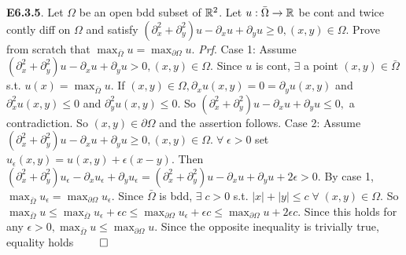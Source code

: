{\bf E6.3.5}. Let $\Omega$ be an open bdd subset of $\mathbb{R}^2$. Let $u: \bar{\Omega}\rightarrow \mathbb{R}$ be cont and twice contly diff on $\Omega$ and satisfy $(\partial_x^2 + \partial_y^2)u - \partial_x u + \partial_y u \geq 0,  (x,y) \in \Omega.$ Prove from scratch that $\max_{\bar{\Omega}} u = \max_{\partial \Omega} u$. {\it Prf}. Case 1:  Assume $(\partial_x^2 + \partial_y^2)u - \partial_x u + \partial_y u > 0, (x,y) \in \Omega$. Since $u$ is cont, $\exists$ a point $(x,y) \in \bar{\Omega}$ s.t. $u(x) = \max_{\bar{\Omega}} u$. If $(x,y) \in \Omega, \partial_x u(x,y) = 0 = \partial_y u(x,y)$ and $\partial_x^2 u(x,y) \leq 0$ and $\partial_y^2 u(x,y) \leq 0$. So $(\partial_x^2 + \partial_y^2)u - \partial_x u + \partial_y u \leq  0,$ a contradiction.  So $(x,y) \in \partial \Omega$ and the assertion follows. Case 2:  Assume 
$(\partial_x^2 + \partial_y^2)u - \partial_x u + \partial_y u \geq 0,  (x,y) \in \Omega.\; \forall \;  \epsilon > 0$ set $u_{\epsilon}(x,y) = u(x,y) + \epsilon(x-y)$. Then $(\partial_x^2 + \partial_y^2)u_{\epsilon} - \partial_x u_{\epsilon} + \partial_y u_{\epsilon} = (\partial_x^2 + \partial_y^2)u - \partial_x u + \partial_y u + 2 \epsilon > 0.$ By case 1, $\max_{\bar{\Omega}} u_{\epsilon} = \max_{\partial \Omega} u_{\epsilon}$. Since $\bar{\Omega}$ is bdd, $\exists \; c >0$ s.t. $|x| + |y| \leq c \; \forall \; (x,y) \in \Omega$. So $\max_{\bar{\Omega}} u \leq \max_{\bar{\Omega}} u_{\epsilon} + \epsilon c \leq \max_{\partial \Omega} u_{\epsilon} + \epsilon c \leq \max_{\partial \Omega} u + 2 \epsilon c.$
Since this holds for any $\epsilon > 0, \max_{\bar{\Omega}} u \leq \max_{\partial \Omega} u$. Since the opposite inequality is trivially true, equality holds $\qed$
